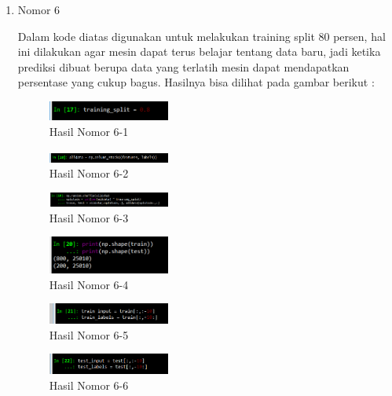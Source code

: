 \begin{enumerate}
\item Nomor 6\\
\hfill\break
	
Dalam kode diatas digunakan untuk melakukan training split 80 persen, hal ini dilakukan agar mesin dapat terus belajar tentang data baru, jadi ketika prediksi dibuat berupa data yang terlatih mesin dapat mendapatkan persentase yang cukup bagus. Hasilnya bisa dilihat pada gambar berikut :
\hfill\break
	\begin{figure}[H]
		\includegraphics[width=4cm]{figures/1174054/6/27.png}
		\centering
		\caption{Hasil Nomor 6-1}
	\end{figure}
	\begin{figure}[H]
		\includegraphics[width=4cm]{figures/1174054/6/28.png}
		\centering
		\caption{Hasil Nomor 6-2}
	\end{figure}
	\begin{figure}[H]
		\includegraphics[width=4cm]{figures/1174054/6/29.png}
		\centering
		\caption{Hasil Nomor 6-3}
	\end{figure}
	\begin{figure}[H]
		\includegraphics[width=4cm]{figures/1174054/6/30.png}
		\centering
		\caption{Hasil Nomor 6-4}
	\end{figure}
	\begin{figure}[H]
		\includegraphics[width=4cm]{figures/1174054/6/31.png}
		\centering
		\caption{Hasil Nomor 6-5}
	\end{figure}
	\begin{figure}[H]
		\includegraphics[width=4cm]{figures/1174054/6/32.png}
		\centering
		\caption{Hasil Nomor 6-6}
	\end{figure}
	\begin{figure}[H]

\end{figure}
\end{enumerate}
